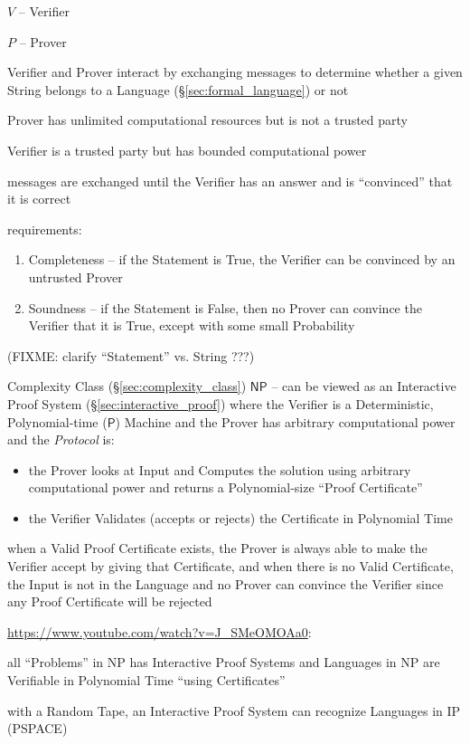 $V$ -- Verifier

$P$ -- Prover

Verifier and Prover interact by exchanging messages to determine whether a given
String belongs to a Language (\S\ref{sec:formal_language}) or not

Prover has unlimited computational resources but is not a trusted party

Verifier is a trusted party but has bounded computational power

messages are exchanged until the Verifier has an answer and is ``convinced''
that it is correct

requirements:
\begin{enumerate}
  \item Completeness -- if the Statement is True, the Verifier can be convinced
    by an untrusted Prover
  \item Soundness -- if the Statement is False, then no Prover can convince the
    Verifier that it is True, except with some small Probability
\end{enumerate}
(FIXME: clarify ``Statement'' vs. String ???)

Complexity Class (\S\ref{sec:complexity_class}) $\mathsf{NP}$ -- can be viewed
as an Interactive Proof System (\S\ref{sec:interactive_proof}) where the
Verifier is a Deterministic, Polynomial-time ($\mathsf{P}$) Machine and the
Prover has arbitrary computational power and the \emph{Protocol} is:
\begin{itemize}
  \item the Prover looks at Input and Computes the solution using arbitrary
    computational power and returns a Polynomial-size ``Proof Certificate''
  \item the Verifier Validates (accepts or rejects) the Certificate in
    Polynomial Time
\end{itemize}
when a Valid Proof Certificate exists, the Prover is always able to make the
Verifier accept by giving that Certificate, and when there is no Valid
Certificate, the Input is not in the Language and no Prover can convince the
Verifier since any Proof Certificate will be rejected

\url{https://www.youtube.com/watch?v=J_SMeOMOAa0}:

all ``Problems'' in NP has Interactive Proof Systems and Languages in NP are
Verifiable in Polynomial Time ``using Certificates''

with a Random Tape, an Interactive Proof System can recognize Languages in IP
(PSPACE)



